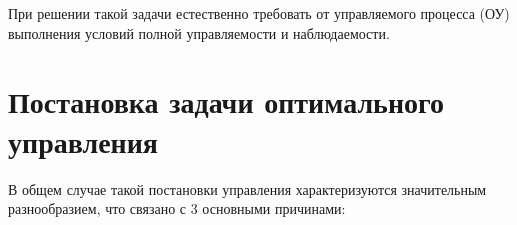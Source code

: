 \documentclass[preprint,russian,a5paper,10pt,twoside]{ncc}
\begin{document}
При решении такой задачи естественно требовать от управляемого процесса (ОУ) выполнения условий полной управляемости и наблюдаемости.

\clearpage		%

\section{Постановка задачи оптимального управления\label{task}}


В общем случае такой постановки управления характеризуются значительным разнообразием, что связано с 3 основными причинами:
\end{document}
